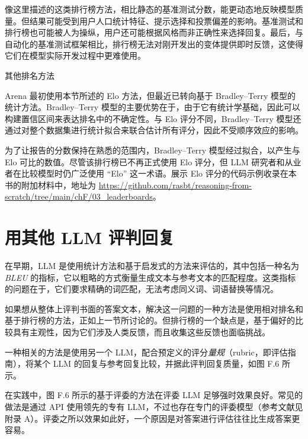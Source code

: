 像这里描述的这类排行榜方法，相比静态的基准测试分数，能更动态地反映模型质量。但结果可能受到用户人口统计特征、提示选择和投票偏差的影响。基准测试和排行榜也可能被人为操纵，用户还可能根据风格而非正确性来选择回复。最后，与自动化的基准测试框架相比，排行榜无法对刚开发出的变体提供即时反馈，这使得它们在模型实际开发过程中更难使用。

\begin{mySidebar}{其他排名方法}

Arena 最初使用本节所述的 Elo 方法，但最近已转向基于 Bradley–Terry 模型的统计方法。Bradley–Terry 模型的主要优势在于，由于它有统计学基础，因此可以构建置信区间来表达排名中的不确定性。与 Elo 评分不同，Bradley–Terry 模型还通过对整个数据集进行统计拟合来联合估计所有评分，因此不受顺序效应的影响。

为了让报告的分数保持在熟悉的范围内，Bradley–Terry 模型经过拟合，以产生与 Elo 可比的数值。尽管该排行榜已不再正式使用 Elo 评分，但 LLM 研究者和从业者在比较模型时仍广泛使用 “Elo” 这一术语。展示 Elo 评分的代码示例收录在本书的附加材料中，地址为 \href{https://github.com/rasbt/reasoning-from-scratch/tree/main/chF/03\_leaderboards}{https://github.com/rasbt/reasoning-from-scratch/tree/main/chF/03\_leaderboards}。

\end{mySidebar}

\section{用其他 LLM 评判回复}

在早期，LLM 是使用统计方法和基于启发式的方法来评估的，其中包括一种名为 \emph{BLEU} 的指标，它以粗略的方式衡量生成文本与参考文本的匹配程度。这类指标的问题在于，它们要求精确的词匹配，无法考虑同义词、词语替换等情况。

如果想从整体上评判书面的答案文本，解决这一问题的一种方法是使用相对排名和基于排行榜的方法，正如上一节所讨论的。但排行榜的一个缺点是，基于偏好的比较具有主观性，因为它们涉及人类反馈，而且收集这些反馈也面临挑战。

一种相关的方法是使用另一个 LLM，配合预定义的评分\emph{量规}（rubric，即评估指南），将某个 LLM 的回复与参考回复比较，并据此评判回复质量，如图 F.6 所示。


在实践中，图 F.6 所示的基于评委的方法在评委 LLM 足够强时效果良好。常见的做法是通过 API 使用领先的专有 LLM，不过也存在专门的评委模型（参考文献见附录 A）。评委之所以效果如此好，一个原因是对答案进行评估往往比生成答案更容易。

